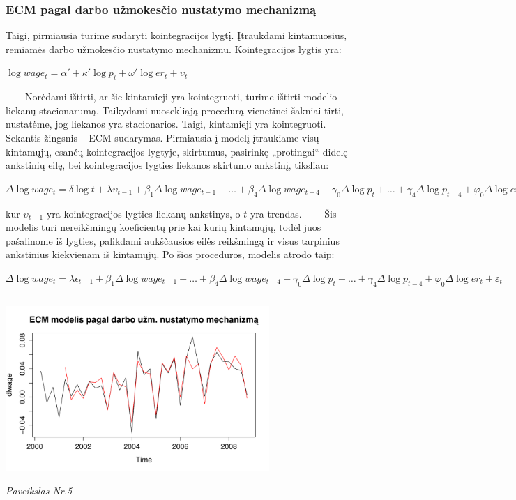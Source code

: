 \documentclass[12pt,a4paper]{article}
\theoremstyle{change}\newtheorem{salyga}{Uždavinys}
\begin{document}
\subsubsection{ECM pagal darbo užmokesčio nustatymo mechanizmą}
\hspace{40pt} Taigi, pirmiausia turime sudaryti kointegracijos lygtį. Įtraukdami kintamuosius, remiamės darbo užmokesčio nustatymo mechanizmu. Kointegracijos lygtis yra:
\vskip 8pt      
\begin{center}
\large$ \log wage_t=\alpha' + \kappa'\log p_t + \omega'\log er_t+\upsilon_t $ 
\end{center}    
\vskip 8pt      
$\qquad$Norėdami ištirti, ar šie kintamieji yra kointegruoti, turime ištirti modelio liekanų stacionarumą. Taikydami nuosekliąją procedurą vienetinei šakniai tirti, nustatėme, jog liekanos yra stacionarios. Taigi, kintamieji yra kointegruoti.
\vskip 8pt 
$\qquad$Sekantis žingsnis – ECM sudarymas. Pirmiausia į modelį įtraukiame visų kintamųjų, esančų kointegracijos lygtyje, skirtumus, pasirinkę „protingai“ didelę ankstinių eilę, bei kointegracijos lygties liekanos skirtumo ankstinį, tiksliau:
\vskip 8pt      
\begin{center}
\large$ \Delta \log wage_t = \delta\log t + \lambda \upsilon_{t-1} + \beta_1\Delta \log wage_{t-1}+ \ldots + \beta_4\Delta \log wage_{t-4}+\gamma_0 \Delta \log p_{t}+\ldots +\gamma_4 \Delta \log p_{t-4}+\varphi_0 \Delta \log er_{t}+\ldots +\varphi_4 \Delta \log er_{t-4}+\varepsilon_t$  
\end{center}
kur $ \upsilon_{t-1} $ yra kointegracijos lygties liekanų ankstinys, o $ t $ yra trendas.
\vskip 8pt   
$\qquad$Šis modelis turi nereikšmingų koeficientų prie kai kurių kintamųjų, todėl juos pašalinome iš lygties, palikdami aukščausios eilės reikšmingą ir visus tarpinius ankstinius kiekvienam iš kintamųjų. Po šios procedūros, modelis atrodo taip:     
\vskip 8pt      
\begin{center}
\large$ \Delta \log wage_t =  \lambda \epsilon_{t-1} + \beta_1\Delta \log wage_{t-1}+ \ldots + \beta_4\Delta \log wage_{t-4}+\gamma_0 \Delta \log p_{t}+\ldots +\gamma_4 \Delta \log p_{t-4}+\varphi_0 \Delta \log er_{t}+\varepsilon_t$  
\end{center}

 \begin{center}
\includegraphics[width=100mm,height=70mm]{ecm12}
\\ \textit{Paveikslas Nr.5}
\end{center}    
     
\end{document}
